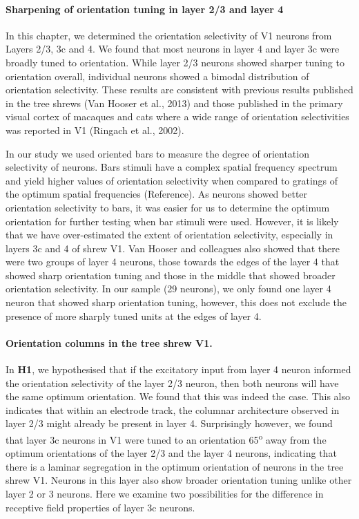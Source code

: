 \paragraph{Sharpening of orientation tuning in layer 2/3 and layer 4}

In this chapter, we determined the orientation selectivity of V1 neurons
from Layers 2/3, 3c and 4. We found that most neurons in layer 4 and
layer 3c were broadly tuned to orientation. While layer 2/3 neurons
showed sharper tuning to orientation overall, individual neurons showed
a bimodal distribution of orientation selectivity. These results are
consistent with previous results published in the tree shrews (Van
Hooser et al., 2013) and those published in the primary visual cortex of
macaques and cats where a wide range of orientation selectivities was
reported in V1 (Ringach et al., 2002).

In our study we used oriented bars to measure the degree of orientation
selectivity of neurons. Bars stimuli have a complex spatial frequency
spectrum and yield higher values of orientation selectivity when
compared to gratings of the optimum spatial frequencies (Reference). As
neurons showed better orientation selectivity to bars, it was easier for
us to determine the optimum orientation for further testing when bar
stimuli were used. However, it is likely that we have over-estimated the
extent of orientation selectivity, especially in layers 3c and 4 of
shrew V1. Van Hooser and colleagues also showed that there were two
groups of layer 4 neurons, those towards the edges of the layer 4 that
showed sharp orientation tuning and those in the middle that showed
broader orientation selectivity. In our sample (29 neurons), we only
found one layer 4 neuron that showed sharp orientation tuning, however,
this does not exclude the presence of more sharply tuned units at the
edges of layer 4.


\paragraph{Orientation columns in the tree shrew V1.}

In \textbf{H1}, we hypothesised that if the excitatory input from layer
4 neuron informed the orientation selectivity of the layer 2/3 neuron,
then both neurons will have the same optimum orientation. We found that
this was indeed the case. This also indicates that within an electrode
track, the columnar architecture observed in layer 2/3 might already be
present in layer 4. Surprisingly however, we found that layer 3c neurons
in V1 were tuned to an orientation 65\textsuperscript{o} away from the
optimum orientations of the layer 2/3 and the layer 4 neurons,
indicating that there is a laminar segregation in the optimum
orientation of neurons in the tree shrew V1. Neurons in this layer also
show broader orientation tuning unlike other layer 2 or 3 neurons. Here
we examine two possibilities for the difference in receptive field
properties of layer 3c neurons.

